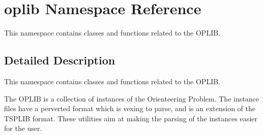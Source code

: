 \hypertarget{namespaceoplib}{}\section{oplib Namespace Reference}
\label{namespaceoplib}


This namespace contains classes and functions related to the O\+P\+L\+IB.  




\subsection{Detailed Description}
This namespace contains classes and functions related to the O\+P\+L\+IB. 

The O\+P\+L\+IB is a collection of instances of the Orienteering Problem. The instance files have a perverted format which is vexing to parse, and is an extension of the T\+S\+P\+L\+IB format. These utilities aim at making the parsing of the instances easier for the user. 